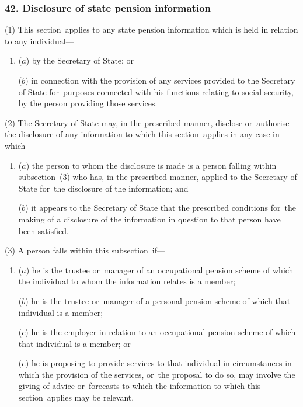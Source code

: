 \documentclass[12pt,a4paper]{article}
\begin{document}
\subsubsection{42. Disclosure of state pension information}

(1) This section~applies to any state pension information which is held in relation to any individual—
\begin{enumerate}\item[]
($a$) by the Secretary of State; or

($b$) in connection with the provision of any services provided to the Secretary of State for~purposes connected with his functions relating to social security, by the person providing those services.
\end{enumerate}

(2) 
The Secretary of State may, in the prescribed manner, disclose or~authorise the disclosure of any information  %
to which this section~applies in any case in which—
\begin{enumerate}\item[]
($a$) the person to whom the disclosure is made is a person falling within subsection~(3)  who has, in the prescribed manner, applied to the Secretary of State for~the disclosure of the information; and

($b$) it appears to the Secretary of State that the prescribed conditions for~the making of a disclosure of the information in question to that person have been satisfied.
\end{enumerate}

(3) A person falls within this subsection~if—
\begin{enumerate}\item[]
($a$) he is the trustee or~manager of an occupational pension scheme of which the individual to whom the information relates is a member;

($b$) he is the trustee or~manager of a personal pension scheme of which that individual is a member;

($c$) he is the employer in relation to an occupational pension scheme of which that individual is a member;
%
or

($e$) he is proposing to provide services to that individual in circumstances in which the provision of the services, or~the proposal to do so, may involve the giving of advice or~forecasts to which the information to which this section~applies may be relevant.
\end{enumerate}
\end{document}

